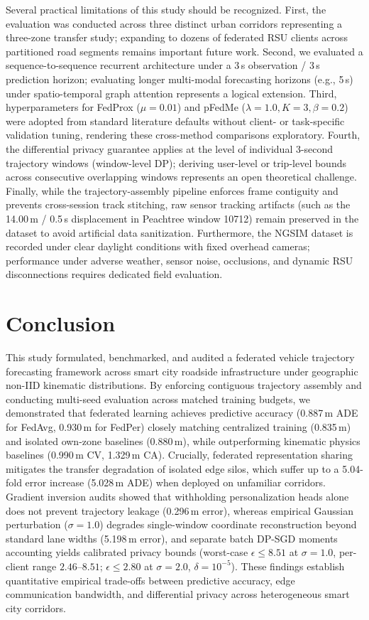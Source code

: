 \documentclass[journal]{IEEEtran}
\begin{document}
Several practical limitations of this study should be recognized. First, the evaluation was conducted across three distinct urban corridors representing a three-zone transfer study; expanding to dozens of federated RSU clients across partitioned road segments remains important future work. Second, we evaluated a sequence-to-sequence recurrent architecture under a 3\,s observation / 3\,s prediction horizon; evaluating longer multi-modal forecasting horizons (e.g., 5\,s) under spatio-temporal graph attention represents a logical extension. Third, hyperparameters for FedProx ($\mu=0.01$) and pFedMe ($\lambda=1.0, K=3, \beta=0.2$) were adopted from standard literature defaults without client- or task-specific validation tuning, rendering these cross-method comparisons exploratory. Fourth, the differential privacy guarantee applies at the level of individual 3-second trajectory windows (window-level DP); deriving user-level or trip-level bounds across consecutive overlapping windows represents an open theoretical challenge. Finally, while the trajectory-assembly pipeline enforces frame contiguity and prevents cross-session track stitching, raw sensor tracking artifacts (such as the 14.00\,m / 0.5\,s displacement in Peachtree window 10712) remain preserved in the dataset to avoid artificial data sanitization. Furthermore, the NGSIM dataset is recorded under clear daylight conditions with fixed overhead cameras; performance under adverse weather, sensor noise, occlusions, and dynamic RSU disconnections requires dedicated field evaluation.

\section{Conclusion}
\label{sec:conclusion}
This study formulated, benchmarked, and audited a federated vehicle trajectory forecasting framework across smart city roadside infrastructure under geographic non-IID kinematic distributions. By enforcing contiguous trajectory assembly and conducting multi-seed evaluation across matched training budgets, we demonstrated that federated learning achieves predictive accuracy (0.887\,m ADE for FedAvg, 0.930\,m for FedPer) closely matching centralized training (0.835\,m) and isolated own-zone baselines (0.880\,m), while outperforming kinematic physics baselines (0.990\,m CV, 1.329\,m CA). Crucially, federated representation sharing mitigates the transfer degradation of isolated edge silos, which suffer up to a 5.04-fold error increase (5.028\,m ADE) when deployed on unfamiliar corridors. Gradient inversion audits showed that withholding personalization heads alone does not prevent trajectory leakage (0.296\,m error), whereas empirical Gaussian perturbation ($\sigma=1.0$) degrades single-window coordinate reconstruction beyond standard lane widths (5.198\,m error), and separate batch DP-SGD moments accounting yields calibrated privacy bounds (worst-case $\epsilon \le 8.51$ at $\sigma=1.0$, per-client range $2.46$--$8.51$; $\epsilon \le 2.80$ at $\sigma=2.0$, $\delta=10^{-5}$). These findings establish quantitative empirical trade-offs between predictive accuracy, edge communication bandwidth, and differential privacy across heterogeneous smart city corridors.
\end{document}
